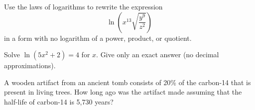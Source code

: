 \begin{exercises} 

\item Use the laws of logarithms to rewrite the expression 
    \[ \ln \left( x^{13} \sqrt{\frac{y^9}{z^2} } \right) \]
    in a form with no logarithm of a power, product, or quotient.
\begin{exerciseSolution}
\end{exerciseSolution}

\item Solve $\ln(5x^2+2) = 4$ for $x$.  Give only an exact answer (no decimal
    approximations).
    \begin{exerciseSolution}
    \end{exerciseSolution}

\item A wooden artifact from an ancient tomb consists of 20\% of the carbon-14 that is
    present in living trees.  How long ago was the artifact made assuming that the
    half-life of carbon-14 is 5,730 years?
\begin{exerciseSolution}
\end{exerciseSolution}



\end{exercises}
\afterexercises
